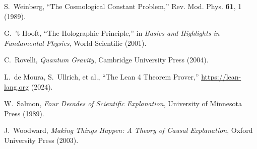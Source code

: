 \documentclass[12pt]{article}
\theoremstyle{remark}
\begin{document}
\begin{thebibliography}{99}
S.~Weinberg,
``The Cosmological Constant Problem,''
Rev. Mod. Phys. \textbf{61}, 1 (1989).

G.~'t Hooft,
``The Holographic Principle,'' in \emph{Basics and Highlights in Fundamental Physics},
World Scientific (2001).

C.~Rovelli,
\emph{Quantum Gravity},
Cambridge University Press (2004).

L.~de Moura, S.~Ullrich, et al.,
``The Lean 4 Theorem Prover,''
\url{https://lean-lang.org} (2024).

W.~Salmon,
\emph{Four Decades of Scientific Explanation},
University of Minnesota Press (1989).

J.~Woodward,
\emph{Making Things Happen: A Theory of Causal Explanation},
Oxford University Press (2003).

\end{thebibliography}
\end{document}
